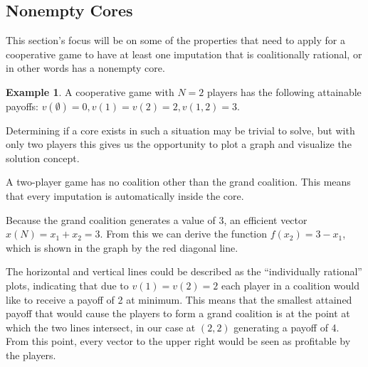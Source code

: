 \documentclass[10pt,a4paper,titlepage]{article}
\theoremstyle{plain}
\theoremstyle{definition}
\newtheorem{example}[thm]{Example} %
\begin{document}
\subsection{Nonempty Cores}
This section's focus will be on some of the properties that need to apply for a cooperative game to have at least one imputation that is coalitionally rational, or in other words has a nonempty core.

\begin{example}
    A cooperative game with $N = 2$ players has the following attainable payoffs: $v(\emptyset) = 0, v(1) = v(2) = 2, v(1, 2) = 3$.

    Determining if a core exists in such a situation may be trivial to solve, but with only two players this gives us the opportunity to plot a graph and visualize the solution concept.
    
    A two-player game has no coalition other than the grand coalition. This means that every imputation is automatically inside the core.
    
\end{example}

Because the grand coalition generates a value of 3, an efficient vector $x(N) = x_1 + x_2 = 3$. From this we can derive the function $f(x_2) = 3 - x_1$, which is shown in the graph by the red diagonal line.

The horizontal and vertical lines could be described as the \enquote{individually rational} plots, indicating that due to $v(1) = v(2) = 2$ each player in a coalition would like to receive a payoff of 2 at minimum. This means that the smallest attained payoff that would cause the players to form a grand coalition is at the point at which the two lines intersect, in our case at $(2, 2)$ generating a payoff of 4. From this point, every vector to the upper right would be seen as profitable by the players.
\end{document}
